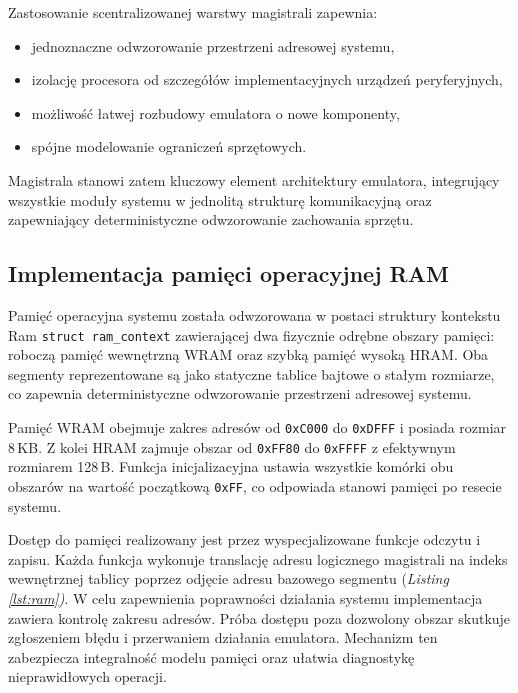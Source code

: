 \documentclass{article}
\begin{document}
Zastosowanie scentralizowanej warstwy magistrali zapewnia:
\begin{itemize}
	\item jednoznaczne odwzorowanie przestrzeni adresowej systemu,
	\item izolację procesora od szczegółów implementacyjnych urządzeń peryferyjnych,
	\item możliwość łatwej rozbudowy emulatora o nowe komponenty,
	\item spójne modelowanie ograniczeń sprzętowych.
\end{itemize}

Magistrala stanowi zatem kluczowy element architektury emulatora, integrujący wszystkie moduły systemu w jednolitą strukturę komunikacyjną oraz zapewniający deterministyczne odwzorowanie zachowania sprzętu.
\subsection{Implementacja pamięci operacyjnej RAM}

Pamięć operacyjna systemu została odwzorowana w postaci struktury kontekstu Ram \texttt{struct ram\_context} zawierającej dwa fizycznie odrębne obszary pamięci: roboczą pamięć wewnętrzną WRAM oraz szybką pamięć wysoką HRAM. Oba segmenty reprezentowane są jako statyczne tablice bajtowe o stałym rozmiarze, co zapewnia deterministyczne odwzorowanie przestrzeni adresowej systemu.

Pamięć WRAM obejmuje zakres adresów od \texttt{0xC000} do \texttt{0xDFFF} i posiada rozmiar 8\,KB. Z kolei HRAM zajmuje obszar od \texttt{0xFF80} do \texttt{0xFFFF} z efektywnym rozmiarem 128\,B. Funkcja inicjalizacyjna ustawia wszystkie komórki obu obszarów na wartość początkową \texttt{0xFF}, co odpowiada stanowi pamięci po resecie systemu.

Dostęp do pamięci realizowany jest przez wyspecjalizowane funkcje odczytu i zapisu. Każda funkcja wykonuje translację adresu logicznego magistrali na indeks wewnętrznej tablicy poprzez odjęcie adresu bazowego segmentu (\textit{Listing \ref{lst:ram})}. W celu zapewnienia poprawności działania systemu implementacja zawiera kontrolę zakresu adresów. Próba dostępu poza dozwolony obszar skutkuje zgłoszeniem błędu i przerwaniem działania emulatora. Mechanizm ten zabezpiecza integralność modelu pamięci oraz ułatwia diagnostykę nieprawidłowych operacji.
\end{document}
